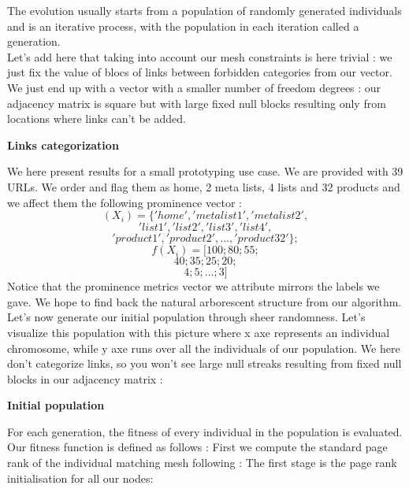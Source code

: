 \documentclass{iSWAGArticle}
\begin{document}
  The evolution usually starts from a population of randomly generated individuals and is an iterative process, with the population in each iteration called a generation.
  \\\newline
  Let's add here that taking into account our mesh constraints is here trivial : we just fix the value of blocs of links between forbidden categories from our
  vector. We just end up with a vector with a smaller number of freedom degrees : our adjacency matrix is square but with large fixed null blocks resulting only from locations where links can't be added.
  \begin{center}
  \textbf{\large Links categorization}
  \end{center}
  \begin{center}
  \end{center}
  We here present results for a small prototyping use case.
  We are provided with 39 URLs. We order and flag them as home, 2 meta lists, 4 lists and 32 products and we affect them
  the following prominence vector :
  $$
  \left(X_i\right)=\{'home','metalist1','metalist2',
  $$
  $$
  'list1','list2','list3','list4',
  $$
  $$
  'product1','product2',...,'product32'\};
  $$
  $$
  f\left(X_i\right) = [100;80;55;$$
  $$
  40;35;25;20;
  $$
  $$
  4;5;...;3]
  $$
  Notice that the prominence metrics vector we attribute mirrors the labels we gave. We hope to find back the natural arborescent structure from our algorithm.
  Let's now generate our initial population through sheer randomness. Let's visualize this population with this picture where x axe represents an individual chromosome, 
  while y axe runs over all the individuals of our population. We here don't categorize links, so you won't see large null streaks resulting from fixed null blocks in our adjacency matrix :
  \\\newline
  \begin{center}
  \textbf{\large Initial population}
  \end{center}
  \begin{center}
  \end{center}
  For each generation, the fitness of every individual in the population is evaluated. Our fitness function is defined as follows :
  First we compute the standard page rank of the individual matching mesh following \cite{page_rank} :
  The first stage is the page rank initialisation for all our nodes:
\end{document}
